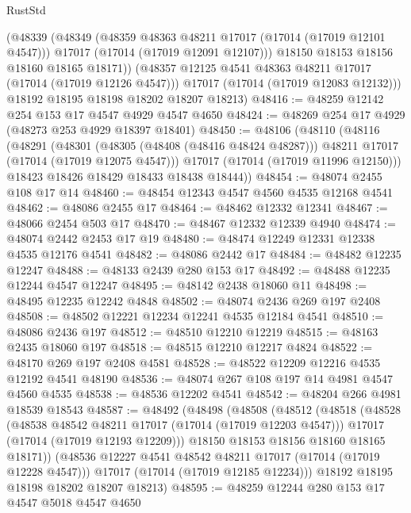 \begin{lexlean}{RustStd}
\begin{coremodule}
          (@48339
            (@48349
              (@48359 @48363 @48211 @17017 (@17014 (@17019 @12101 @4547)))
              @17017
              (@17014 (@17019 @12091 @12107)))
            @18150
            @18153
            @18156
            @18160
            @18165
            @18171))
        (@48357 @12125 @4541 @48363 @48211 @17017 (@17014 (@17019 @12126 @4547)))
        @17017
        (@17014 (@17019 @12083 @12132)))
      @18192
      @18195
      @18198
      @18202
      @18207
      @18213)
@48416 := @48259 @12142 @254 @153 @17 @4547 @4929 @4547 @4650
@48424 := @48269 @254 @17 @4929 (@48273 @253 @4929 @18397 @18401)
@48450 := @48106
    (@48110
      (@48116
        (@48291
          (@48301
            (@48305 (@48408 (@48416 @48424 @48287)))
            @48211
            @17017
            (@17014 (@17019 @12075 @4547)))
          @17017
          (@17014 (@17019 @11996 @12150)))
        @18423
        @18426
        @18429
        @18433
        @18438
        @18444))
@48454 := @48074 @2455 @108 @17 @14
@48460 := @48454 @12343 @4547 @4560 @4535 @12168 @4541
@48462 := @48086 @2455 @17
@48464 := @48462 @12332 @12341
@48467 := @48066 @2454 @503 @17
@48470 := @48467 @12332 @12339 @4940
@48474 := @48074 @2442 @2453 @17 @19
@48480 := @48474 @12249 @12331 @12338 @4535 @12176 @4541
@48482 := @48086 @2442 @17
@48484 := @48482 @12235 @12247
@48488 := @48133 @2439 @280 @153 @17
@48492 := @48488 @12235 @12244 @4547 @12247
@48495 := @48142 @2438 @18060 @11
@48498 := @48495 @12235 @12242 @4848
@48502 := @48074 @2436 @269 @197 @2408
@48508 := @48502 @12221 @12234 @12241 @4535 @12184 @4541
@48510 := @48086 @2436 @197
@48512 := @48510 @12210 @12219
@48515 := @48163 @2435 @18060 @197
@48518 := @48515 @12210 @12217 @4824
@48522 := @48170 @269 @197 @2408 @4581
@48528 := @48522 @12209 @12216 @4535 @12192 @4541 @48190
@48536 := @48074 @267 @108 @197 @14 @4981 @4547 @4560 @4535
@48538 := @48536 @12202 @4541
@48542 := @48204 @266 @4981 @18539 @18543
@48587 := @48492
    (@48498
      (@48508
        (@48512
          (@48518
            (@48528
              (@48538 @48542 @48211 @17017 (@17014 (@17019 @12203 @4547)))
              @17017
              (@17014 (@17019 @12193 @12209)))
            @18150
            @18153
            @18156
            @18160
            @18165
            @18171))
        (@48536 @12227 @4541 @48542 @48211 @17017 (@17014 (@17019 @12228 @4547)))
        @17017
        (@17014 (@17019 @12185 @12234)))
      @18192
      @18195
      @18198
      @18202
      @18207
      @18213)
@48595 := @48259 @12244 @280 @153 @17 @4547 @5018 @4547 @4650

\end{coremodule}
\end{lexlean}
